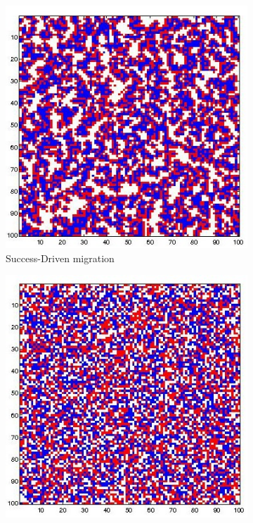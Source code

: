 \documentclass[11pt]{article}
\begin{document}
\begin{figure}[H]
	\centering
	\begin{subfigure}[t]{0.3\textwidth}
        \includegraphics[width=\textwidth]{../../other/grids/m1-t200-a5-g300.jpg}
	\caption{Success-Driven migration}
	\label{fig:grids_no_imitation1}
    	\end{subfigure}
	\begin{subfigure}[t]{0.3\textwidth}
        \includegraphics[width=\textwidth]{../../other/grids/m4-t200-a5-g300.jpg}

\end{subfigure}
\end{figure}
\end{document}
